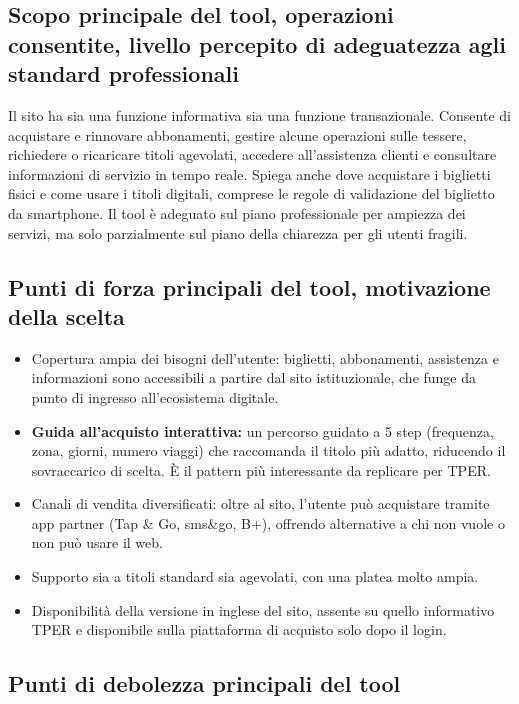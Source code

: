 \documentclass[11pt,a4paper]{article}
\begin{document}
\subsection*{Scopo principale del tool, operazioni consentite, livello percepito di adeguatezza agli standard professionali}

\noindent Il sito ha sia una funzione informativa sia una funzione transazionale. Consente di acquistare e rinnovare abbonamenti, gestire alcune operazioni sulle tessere, richiedere o ricaricare titoli agevolati, accedere all’assistenza clienti e consultare informazioni di servizio in tempo reale. Spiega anche dove acquistare i biglietti fisici e come usare i titoli digitali, comprese le regole di validazione del biglietto da smartphone. Il tool è adeguato sul piano professionale per ampiezza dei servizi, ma solo parzialmente sul piano della chiarezza per gli utenti fragili. 

\subsection*{Punti di forza principali del tool, motivazione della scelta}

\begin{itemize}
    \item Copertura ampia dei bisogni dell'utente: biglietti, abbonamenti,
    assistenza e informazioni sono accessibili a partire dal sito
    istituzionale, che funge da punto di ingresso all'ecosistema digitale.
    \item \textbf{Guida all'acquisto interattiva:} un percorso guidato a
    5 step (frequenza, zona, giorni, numero viaggi) che raccomanda il
    titolo più adatto, riducendo il sovraccarico di scelta. È il pattern
    più interessante da replicare per TPER.
    \item Canali di vendita diversificati: oltre al sito, l'utente può
    acquistare tramite app partner (Tap \& Go, sms\&go, B+), offrendo
    alternative a chi non vuole o non può usare il web.
    \item Supporto sia a titoli standard sia agevolati, con una platea
    molto ampia.
    \item Disponibilità della versione in inglese del sito, assente su
    quello informativo TPER e disponibile sulla piattaforma di acquisto
    solo dopo il login.
\end{itemize}

\subsection*{Punti di debolezza principali del tool}
\end{document}
